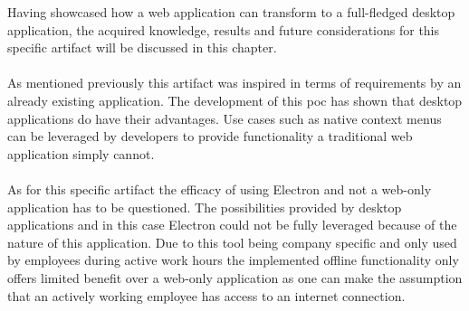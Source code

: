 
Having showcased how a web application can transform to a full-fledged desktop application, the acquired 
knowledge, results and future considerations for this specific artifact will be discussed in this chapter.\paragraph{}
As mentioned previously this artifact was inspired in terms of requirements by an already existing application. 
The development of this \acrshort{poc} has shown that desktop applications do have their advantages.
Use cases such as native context menus can be leveraged by developers to provide functionality a traditional 
web application simply cannot.\paragraph{}
As for this specific artifact the efficacy of using Electron and not a web-only application has to be questioned.
The possibilities provided by desktop applications and in this case Electron could not be fully leveraged 
because of the nature of this application.
Due to this tool being company specific and only used by employees during active work hours the implemented offline 
functionality only offers limited benefit over a web-only application as one can make the assumption
that an actively working employee has access to an internet connection.\paragraph{}
